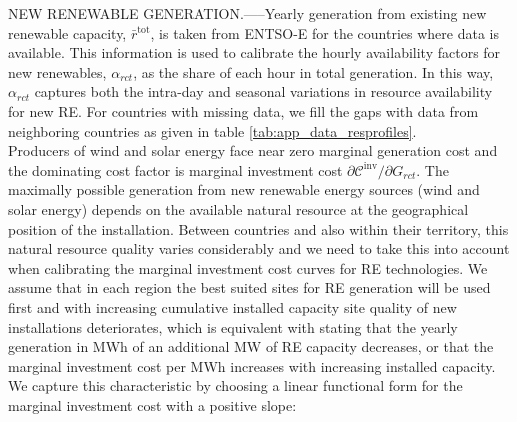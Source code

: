 \documentclass[authoryear]{elsarticle}
\begin{document}
\footnotesize\MakeUppercase{New Renewable Generation}.-----\normalsize Yearly generation from existing new renewable capacity, $\bar{r}^\mathrm{tot}$, is taken from ENTSO-E\cite{entsoe-generation} for the countries where data is available. This information is used to calibrate the hourly availability factors for new renewables, $\alpha_{rct}$, as the share of each hour in total generation. In this way, $\alpha_{rct}$ captures both the intra-day and seasonal variations in resource availability for new RE. For countries with missing data, we fill the gaps with data from neighboring countries as given in table \ref{tab:app_data_resprofiles}.\\ 
Producers of wind and solar energy face near zero marginal generation cost and the dominating cost factor is marginal investment cost $\partial \mathcal{C}^\mathrm{inv}/\partial G_{rct}$. The maximally possible generation from new renewable energy sources (wind and solar energy) depends on the available natural resource at the geographical position of the installation. Between countries and also within their territory, this natural resource quality varies considerably and we need to take this into account when calibrating the marginal investment cost curves for RE technologies. We assume that in each region the best suited sites for RE generation will be used first and with increasing cumulative installed capacity site quality of new installations deteriorates, which is equivalent with stating that the yearly generation in MWh of an additional MW of RE capacity decreases, or that the marginal investment cost per MWh increases with increasing installed capacity. We capture this characteristic by choosing a linear functional form for the marginal investment cost with a positive slope:
\end{document}
